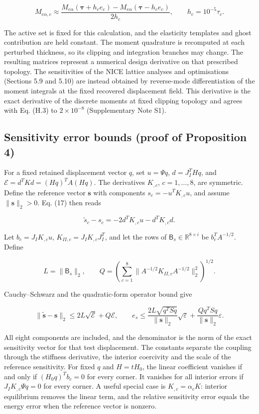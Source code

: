 \documentclass[preprint,12pt,authoryear]{elsarticle}
\begin{document}
\[
M_{e\alpha,c}\approx
\frac{M_{e\alpha}(\boldsymbol\tau+h_ce_c)-M_{e\alpha}(\boldsymbol\tau-h_ce_c)}{2h_c},
\qquad h_c=10^{-5}\tau_c.
\tag{H.3}
\]

The active set is fixed for this calculation, and the elasticity templates and ghost contribution are held constant. The moment quadrature is recomputed at each perturbed thickness, so its clipping and integration branches may change. The resulting matrices represent a numerical design derivative on that prescribed topology. The sensitivities of the NICE lattice analyses and optimisations (Sections 5.9 and 5.10) are instead obtained by reverse-mode differentiation of the moment integrals at the fixed recovered displacement field. This derivative is the exact derivative of the discrete moments at fixed clipping topology and agrees with Eq. (H.3) to \(2\times10^{-8}\) (Supplementary Note S1).

\subsection{Sensitivity error bounds (proof of Proposition 4)}

For a fixed retained displacement vector \(q\), set \(u=\Psi q\), \(d=J_I^THq\), and \(\mathcal E=d^TKd=(Hq)^TA(Hq)\). The derivatives \(K_{,c}\), \(c=1,\ldots,8\), are symmetric. Define the reference vector \(\boldsymbol s\) with components \(s_c=-u^TK_{,c}u\), and assume \(\|\boldsymbol s\|_2>0\). Eq. (17) then reads

\[
\widetilde s_c-s_c=-2d^TK_{,c}u-d^TK_{,c}d.
\]

Let \(b_c=J_IK_{,c}u\), \(K_{II,c}=J_IK_{,c}J_I^T\), and let the rows of \(\mathsf B_s\in\mathbb R^{8\times i}\) be \(b_c^TA^{-1/2}\). Define

\[
L=\|\mathsf B_s\|_2,\qquad
Q=\left(\sum_{c=1}^8\|A^{-1/2}K_{II,c}A^{-1/2}\|_2^2\right)^{1/2}.
\]

Cauchy--Schwarz and the quadratic-form operator bound give

\[
\boxed{\|\widetilde{\boldsymbol s}-\boldsymbol s\|_2
\le2L\sqrt{\mathcal E}+Q\mathcal E,
\qquad e_s\le\frac{2L\sqrt{q^TSq}}{\|\boldsymbol s\|_2}\sqrt\varepsilon
+\frac{Qq^TSq}{\|\boldsymbol s\|_2}\varepsilon.}
\tag{H.4}
\]

All eight components are included, and the denominator is the norm of the exact sensitivity vector for that test displacement. The constants separate the coupling through the stiffness derivative, the interior coercivity and the scale of the reference sensitivity. For fixed \(q\) and \(H=tH_0\), the linear coefficient vanishes if and only if \((H_0q)^Tb_c=0\) for every corner. It vanishes for all interior errors if \(J_IK_{,c}\Psi q=0\) for every corner. A useful special case is \(K_{,c}=\alpha_cK\): interior equilibrium removes the linear term, and the relative sensitivity error equals the energy error when the reference vector is nonzero.
\end{document}
